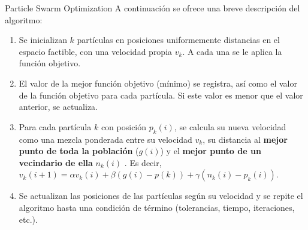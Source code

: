 \documentclass{beamer}
\begin{document}
\begin{myFrame}{Particle Swarm Optimization}
A continuación se ofrece una breve descripción del algoritmo:

\begin{enumerate}
\item Se inicializan $k$ partículas en posiciones uniformemente distancias en el espacio factible, con una velocidad propia $v_k$. A cada una se le aplica la función objetivo.
\item El valor de la mejor función objetivo (mínimo) se registra, así como el valor de la función objetivo para cada partícula. Si este valor es menor que el valor anterior, se actualiza.
\item Para cada partícula $k$ con posición $p_k(i)$, se calcula su nueva velocidad como una mezcla ponderada entre su velocidad  $v_k$, su distancia al \textbf{mejor punto de toda la población} ($g(i)$) y el \textbf{mejor punto de un vecindario de ella} $n_k(i)$ . Es decir, $v_k(i+1) = \alpha v_k(i)+\beta (g(i)-p(k))+\gamma (n_k(i)-p_k(i))$.
\item Se actualizan las posiciones de las partículas según su velocidad y se repite el algoritmo hasta una condición de término (tolerancias, tiempo, iteraciones, etc.).
\end{enumerate}

\framebreak


\end{myFrame}
\end{document}
